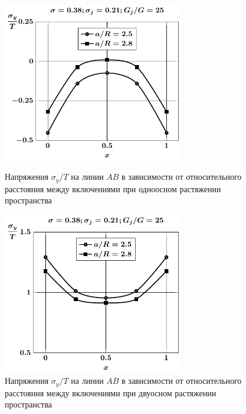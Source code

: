 \begin{figure}[h!]
\centering\footnotesize
\parbox[b]{7.5cm}{\centering\includegraphics[width=7.8cm]{inc9-a-d95-g25-t1-sig_y.pdf}
\caption{Напряжения $\sigma_y/T$ на линии  $AB$ в зависимости от относительного расстояния между включениями при одноосном растяжении пространства
\label{f:8:66}}}\hfil\hfil
\parbox[b]{7.5cm}{\centering\includegraphics[width=7.8cm]{inc9-a-d95-g25-t2-sig_y.pdf}
\caption{Напряжения $\sigma_y/T$ на линии  $AB$ в зависимости от относительного расстояния между включениями при двуосном растяжении пространства
\label{f:8:67}}}
\end{figure}

